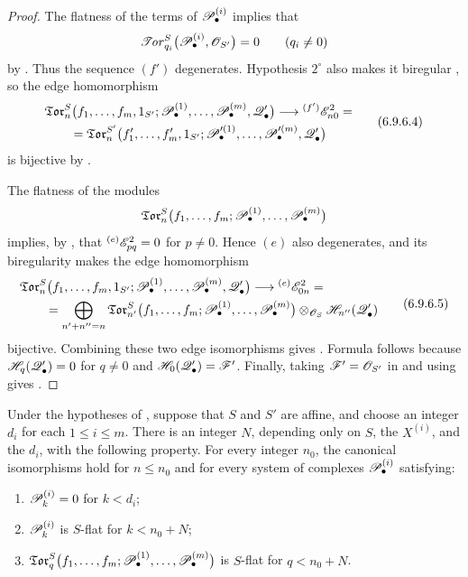\begin{proof}
The flatness of the terms of $\mathscr{P}_\bullet^{(i)}$ implies that
\[
  \mathscr{T}\!\mathit{or}_{q_i}^S
  \bigl(
    \mathscr{P}_\bullet^{(i)},\mathscr{O}_{S'}
  \bigr)
  =
  0
  \qquad(q_i\neq0)
\]
by .  Thus the sequence $(f')$ degenerates.
Hypothesis $2^\circ$ also makes it biregular
, so the edge homomorphism
\[
\begin{split}
  &
  \mathfrak{Tor}_n^S
  \bigl(
    f_1,\ldots,f_m,1_{S'};
    \mathscr{P}_\bullet^{(1)},\ldots,\mathscr{P}_\bullet^{(m)},
    \mathscr{Q}_\bullet'
  \bigr)
  \longrightarrow
  {}^{(f')}\mathscr{E}_{n0}^2=
  \\
  &\qquad =
  \mathfrak{Tor}_n^{S'}
  \bigl(
    f_1',\ldots,f_m',1_{S'};
    \mathscr{P}_\bullet^{\prime(1)},\ldots,
    \mathscr{P}_\bullet^{\prime(m)},\mathscr{Q}_\bullet'
  \bigr)
\end{split}
  \tag{6.9.6.4}\label{III.6.9.6.4.eq}
\]
is bijective by .

The flatness of the modules
\[
  \mathfrak{Tor}_n^S
  \bigl(
    f_1,\ldots,f_m;
    \mathscr{P}_\bullet^{(1)},\ldots,\mathscr{P}_\bullet^{(m)}
  \bigr)
\]
implies, by , that
${}^{(e)}\mathscr{E}_{pq}^2=0$ for $p\neq0$.  Hence $(e)$ also
degenerates, and its biregularity makes the edge homomorphism
\[
\begin{split}
  &
  \mathfrak{Tor}_n^S
  \bigl(
    f_1,\ldots,f_m,1_{S'};
    \mathscr{P}_\bullet^{(1)},\ldots,\mathscr{P}_\bullet^{(m)},
    \mathscr{Q}_\bullet'
  \bigr)
  \longrightarrow
  {}^{(e)}\mathscr{E}_{0n}^2=
  \\
  &\qquad =
  \bigoplus_{n'+n''=n}
  \mathfrak{Tor}_{n'}^S
  \bigl(
    f_1,\ldots,f_m;
    \mathscr{P}_\bullet^{(1)},\ldots,\mathscr{P}_\bullet^{(m)}
  \bigr)
  \otimes_{\mathscr{O}_S}
  \mathscr{H}_{n''}(\mathscr{Q}_\bullet')
\end{split}
  \tag{6.9.6.5}\label{III.6.9.6.5.eq}
\]
bijective.  Combining these two edge isomorphisms gives
.  Formula  follows because
$\mathscr{H}_q(\mathscr{Q}_\bullet')=0$ for $q\neq0$ and
$\mathscr{H}_0(\mathscr{Q}_\bullet')=\mathscr{F}'$.  Finally, taking
$\mathscr{F}'=\mathscr{O}_{S'}$ in  and using
 gives .
\end{proof}

\begin{corollary}[6.9.7]
\label{III.6.9.7}
Under the hypotheses of , suppose that $S$ and
$S'$ are affine, and choose an integer $d_i$ for each
$1\leq i\leq m$.  There is an integer $N$, depending only on $S$,
the $X^{(i)}$, and the $d_i$, with the following property.  For
every integer $n_0$, the canonical isomorphisms
 hold for $n\leq n_0$ and for every system of
complexes $\mathscr{P}_\bullet^{(i)}$ satisfying:
\begin{enumerate}
  \item[$1^\circ$] $\mathscr{P}_k^{(i)}=0$ for $k<d_i$;
  \item[$2^\circ$] $\mathscr{P}_k^{(i)}$ is $S$-flat for
  $k<n_0+N$;
  \item[$3^\circ$] $\mathfrak{Tor}_q^S
\bigl(
f_1,\ldots,f_m;
\mathscr{P}_\bullet^{(1)},\ldots,\mathscr{P}_\bullet^{(m)}
\bigr)$
  is $S$-flat for $q<n_0+N$.
\end{enumerate}
\end{corollary}

